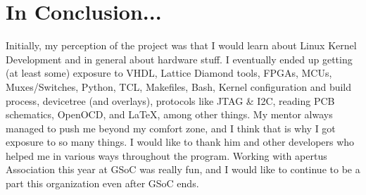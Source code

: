 \documentclass{article}
\begin{document}
\section{In Conclusion...}

Initially, my perception of the project was that I would learn about Linux
Kernel Development and in general about hardware stuff.
I eventually ended up getting (at least some)
exposure to VHDL, Lattice Diamond tools, FPGAs, MCUs, Muxes/Switches,
Python, TCL, Makefiles,
Bash, Kernel configuration and build process, devicetree (and overlays), protocols like JTAG \& I2C,
reading PCB schematics, OpenOCD, and \LaTeX, among other things.
My mentor always managed to push me beyond my comfort zone, and I think that is
why I got exposure to so many things.
I would like to
thank him and other developers who helped me in various ways throughout the program.
Working with {apertus\textdegree} Association this year at GSoC was really fun,
and I would like to continue to be a part this organization even after GSoC ends. 
\end{document}
